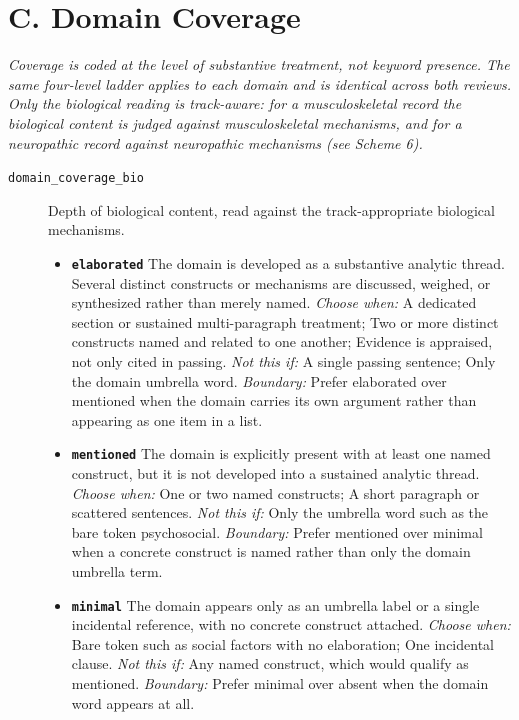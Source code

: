 \documentclass[11pt]{article}
\begin{document}
\section*{C. Domain Coverage}
{\small\itshape Coverage is coded at the level of substantive treatment, not keyword presence. The same four-level ladder applies to each domain and is identical across both reviews. Only the biological reading is track-aware: for a musculoskeletal record the biological content is judged against musculoskeletal mechanisms, and for a neuropathic record against neuropathic mechanisms (see Scheme 6).}\par\smallskip
\begin{description}
\item[\texttt{domain\_coverage\_bio}] Depth of biological content, read against the track-appropriate biological mechanisms.
  \begin{itemize}[leftmargin=1.3em,itemsep=2pt,topsep=2pt]
  \item \textbf{\texttt{elaborated}} The domain is developed as a substantive analytic thread. Several distinct constructs or mechanisms are discussed, weighed, or synthesized rather than merely named. {\small \textit{Choose when:} A dedicated section or sustained multi-paragraph treatment; Two or more distinct constructs named and related to one another; Evidence is appraised, not only cited in passing. \textit{Not this if:} A single passing sentence; Only the domain umbrella word. \textit{Boundary:} Prefer elaborated over mentioned when the domain carries its own argument rather than appearing as one item in a list.}
  \item \textbf{\texttt{mentioned}} The domain is explicitly present with at least one named construct, but it is not developed into a sustained analytic thread. {\small \textit{Choose when:} One or two named constructs; A short paragraph or scattered sentences. \textit{Not this if:} Only the umbrella word such as the bare token psychosocial. \textit{Boundary:} Prefer mentioned over minimal when a concrete construct is named rather than only the domain umbrella term.}
  \item \textbf{\texttt{minimal}} The domain appears only as an umbrella label or a single incidental reference, with no concrete construct attached. {\small \textit{Choose when:} Bare token such as social factors with no elaboration; One incidental clause. \textit{Not this if:} Any named construct, which would qualify as mentioned. \textit{Boundary:} Prefer minimal over absent when the domain word appears at all.}

\end{itemize}
\end{description}
\end{document}
